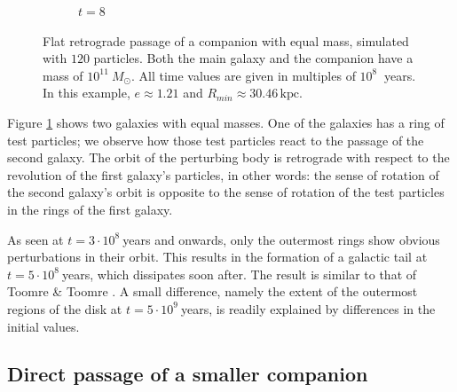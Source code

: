 \documentclass[11pt,twocolumn]{article}
\newcommand{\unit}[1]{\ensuremath{\, \mathrm{#1}}}
\begin{document}
\begin{figure}[!htbp]
\begin{subfigure}[b]{0.2\textwidth}
    				\caption{$t = 8$}
  			\end{subfigure}
            \caption{Flat retrograde passage of a companion with equal mass, simulated with $120$ particles. Both the main galaxy and the companion have a mass of $10^{11}\: M_\odot$. All time values are given in multiples of $10^8\:$ years. In this example, $e \approx 1.21$ and $R_{min} \approx 30.46 \unit{kpc}$.}
            
            \label{fig:fig3}
		\end{figure}
Figure \ref{fig:fig3} shows two galaxies with equal masses. One of the galaxies has a ring of test particles; we observe how those test particles react to the passage of the second galaxy. The orbit of the perturbing body is retrograde with respect to the revolution of the first galaxy's particles, in other words: the sense of rotation of the second galaxy's orbit is opposite to the sense of rotation of the test particles in the rings of the first galaxy.

    
As seen at $t = 3\cdot 10^8\:$years and onwards, only the outermost rings show obvious perturbations in their orbit. This results in the formation of a galactic tail at $t = 5\cdot 10^8\:$years, which dissipates soon after. The result is similar to that of Toomre \& Toomre  \cite{toomre1972galactic}. A small difference, namely the extent of the outermost regions of the disk at $t=5\cdot 10^9\:$years, is readily explained by differences in the initial values.
        
\subsection{Direct passage of a smaller companion}
        
\end{document}
